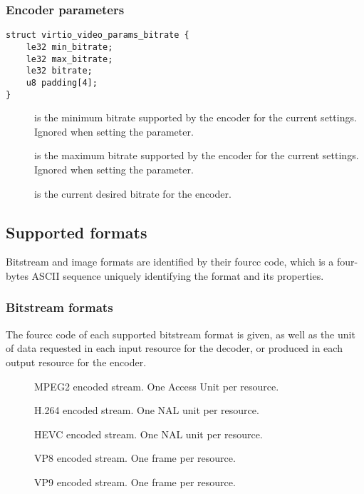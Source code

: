\subsubsection{Encoder parameters}\label{sec:Device Types / Video Device / Parameters / Encoder parameters}

\begin{lstlisting}
struct virtio_video_params_bitrate {
    le32 min_bitrate;
    le32 max_bitrate;
    le32 bitrate;
    u8 padding[4];
}
\end{lstlisting}

\begin{description}
\item[]
is the minimum bitrate supported by the encoder for the current
settings. Ignored when setting the parameter.
\item[]
is the maximum bitrate supported by the encoder for the current
settings. Ignored when setting the parameter.
\item[]
is the current desired bitrate for the encoder.
\end{description}

\subsection{Supported formats}\label{sec:Device Types / Video Device / Supported formats}

Bitstream and image formats are identified by their fourcc code, which
is a four-bytes ASCII sequence uniquely identifying the format and its
properties.

\subsubsection{Bitstream formats}\label{sec:Device Types / Video Device / Supported formats / Bitstream formats}

The fourcc code of each supported bitstream format is given, as well as
the unit of data requested in each input resource for the decoder, or
produced in each output resource for the encoder.

\begin{description}
\item[]
MPEG2 encoded stream. One Access Unit per resource.
\item[]
H.264 encoded stream. One NAL unit per resource.
\item[]
HEVC encoded stream. One NAL unit per resource.
\item[]
VP8 encoded stream. One frame per resource.
\item[]
VP9 encoded stream. One frame per resource.
\end{description}

